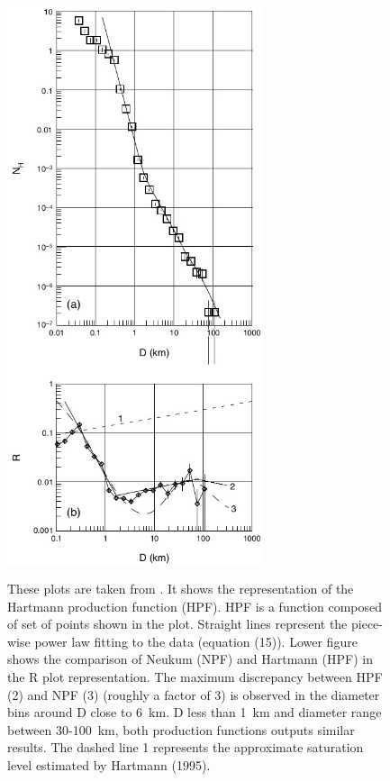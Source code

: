 \documentclass[11pt]{article}
\begin{document}
\begin{figure}[H]
	\centering
	\includegraphics[width=75mm,height=170mm,  scale=0.8]{files/lunar_functions/HPF.jpg}
	\caption{These plots are taken from \cite{ivanov2002comparison}. It shows the representation of the Hartmann production function (HPF). HPF is a function composed of set of
		points shown in the plot. Straight lines represent the piece-wise
		power law fitting to the data (equation (15)). Lower figure shows the comparison of Neukum (NPF) and Hartmann (HPF)
		in the R plot representation. The maximum discrepancy between
		HPF (2) and NPF (3) (roughly a factor of 3) is observed in the
		diameter bins around D close to \SI{6}{km}. D less than \SI{1}{km} and diameter range between 30-\SI{100}{km}, both production functions outputs similar results. The dashed line 1 represents the approximate saturation level estimated by Hartmann (1995).}
	\label{HPF}
\end{figure}
\end{document}
